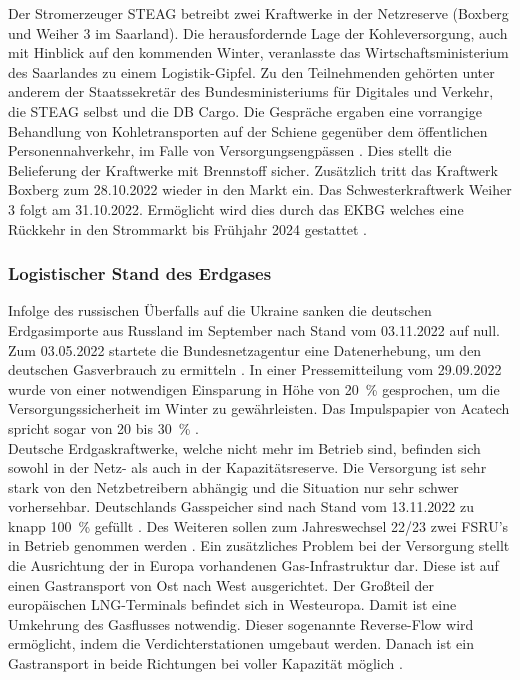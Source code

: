 			Der Stromerzeuger STEAG betreibt zwei Kraftwerke in der Netzreserve (Boxberg und Weiher 3 im Saarland). 
			Die herausfordernde Lage der Kohleversorgung, auch mit Hinblick auf den kommenden Winter, veranlasste das Wirtschaftsministerium des Saarlandes zu einem Logistik-Gipfel. 
			Zu den Teilnehmenden gehörten unter anderem der Staatssekretär des Bundesministeriums für Digitales und Verkehr, die STEAG selbst und die DB Cargo. 
			Die Gespräche ergaben eine vorrangige Behandlung von Kohletransporten auf der Schiene gegenüber dem öffentlichen Personennahverkehr, im Falle von Versorgungsengpässen \cite{Logistikgipfel_Saarland}. 
			Dies stellt die Belieferung der Kraftwerke mit Brennstoff sicher. 
			Zusätzlich tritt das Kraftwerk Boxberg zum 28.10.2022 wieder in den Markt ein. 
			Das Schwesterkraftwerk Weiher 3 folgt am 31.10.2022. 
			Ermöglicht wird dies durch das EKBG welches eine Rückkehr in den Strommarkt bis Frühjahr 2024 gestattet \cite{STEAG_Steinkohle}. 
	
	
		\subsubsection{Logistischer Stand des Erdgases}
		
			Infolge des russischen Überfalls auf die Ukraine sanken die deutschen Erdgasimporte aus Russland im September nach Stand vom 03.11.2022 auf null. 
			Zum 03.05.2022 startete die Bundesnetzagentur eine Datenerhebung, um den deutschen Gasverbrauch zu ermitteln \cite{Datenerhebung_Gas}. 
			In einer Pressemitteilung vom 29.09.2022 wurde von einer notwendigen Einsparung in Höhe von \SI{20}{\percent} gesprochen, um die Versorgungssicherheit im Winter zu gewährleisten.
			Das Impulspapier von Acatech spricht sogar von 20 bis \SI{30}{\percent} \cite{Impuls_Acatech_Einsparung}. \\
			
			Deutsche Erdgaskraftwerke, welche nicht mehr im Betrieb sind, befinden sich sowohl in der Netz- als auch in der Kapazitätsreserve. 
			Die Versorgung ist sehr stark von den Netzbetreibern abhängig und die Situation nur sehr schwer vorhersehbar. 
			Deutschlands Gasspeicher sind nach Stand vom 13.11.2022 zu knapp \SI{100}{\percent} gefüllt \cite{Speicherfüllstände}. 
			Des Weiteren sollen zum Jahreswechsel 22/23 zwei FSRU's in Betrieb genommen werden \cite{LNG_FSRU}.
			Ein zusätzliches Problem bei der Versorgung stellt die Ausrichtung der in Europa vorhandenen Gas-Infrastruktur dar. 
			Diese ist auf einen Gastransport von Ost nach West ausgerichtet. 
			Der Großteil der europäischen LNG-Terminals befindet sich in Westeuropa. 
			Damit ist eine Umkehrung des Gasflusses notwendig. 
			Dieser sogenannte Reverse-Flow wird ermöglicht, indem die Verdichterstationen umgebaut werden. 
			Danach ist ein Gastransport in beide Richtungen bei voller Kapazität möglich \cite{Impuls_Acatech_Reverse_Flow}. \\
			
